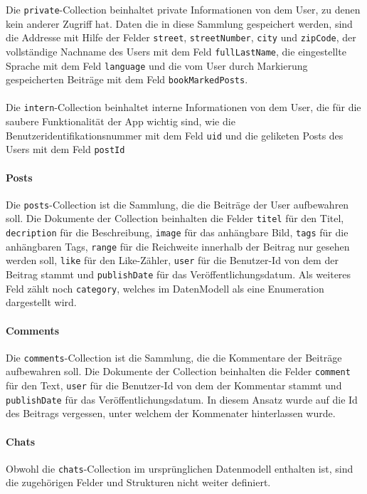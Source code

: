 Die \texttt{private}-Collection beinhaltet private Informationen von dem User, zu denen kein anderer Zugriff hat. Daten die in diese Sammlung gespeichert werden, sind die Addresse mit Hilfe der Felder \texttt{street}, \texttt{streetNumber}, \texttt{city} und \texttt{zipCode}, der vollständige Nachname des Users mit dem Feld \texttt{fullLastName}, die eingestellte Sprache mit dem Feld \texttt{language} und die vom User durch Markierung gespeicherten Beiträge mit dem Feld \texttt{bookMarkedPosts}.
\\\\
Die \texttt{intern}-Collection beinhaltet interne Informationen von dem User, die für die saubere Funktionalität der App wichtig sind, wie die Benutzeridentifikationsnummer mit dem Feld \texttt{uid} und die geliketen Posts des Users mit dem Feld \texttt{postId}

\paragraph{Posts}
Die \texttt{posts}-Collection ist die Sammlung, die die Beiträge der User aufbewahren soll. Die Dokumente der Collection beinhalten die Felder \texttt{titel} für den Titel, \texttt{decription} für die Beschreibung, \texttt{image} für das anhängbare Bild, \texttt{tags} für die anhängbaren Tags, \texttt{range} für die Reichweite innerhalb der Beitrag nur gesehen werden soll, \texttt{like} für den Like-Zähler, \texttt{user} für die Benutzer-Id von dem der Beitrag stammt und \texttt{publishDate} für das Veröffentlichungsdatum. Als weiteres Feld zählt noch \texttt{category}, welches im DatenModell als eine Enumeration dargestellt wird.

\paragraph{Comments}
Die \texttt{comments}-Collection ist die Sammlung, die die Kommentare der Beiträge aufbewahren soll. Die Dokumente der Collection beinhalten die Felder \texttt{comment} für den Text, \texttt{user} für die Benutzer-Id von dem der Kommentar stammt und \texttt{publishDate} für das Veröffentlichungsdatum. In diesem Ansatz wurde auf die Id des Beitrags vergessen, unter welchem der Kommenater hinterlassen wurde.

\paragraph{Chats}
Obwohl die \texttt{chats}-Collection im ursprünglichen Datenmodell enthalten ist, sind die zugehörigen Felder und Strukturen nicht weiter definiert.

